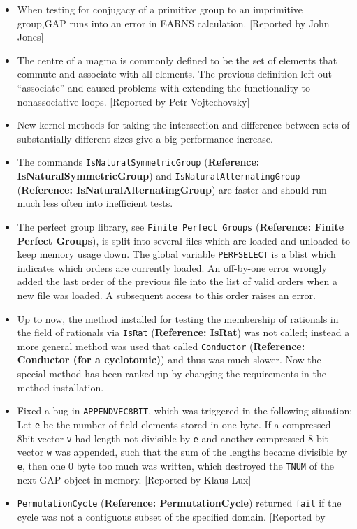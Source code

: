 \documentclass[a4paper,11pt]{report}
\begin{document}
{{\begin{itemize}
\item  When testing for conjugacy of a primitive group to an imprimitive group,\textsf{GAP} runs into an error in EARNS calculation. [Reported by John Jones] 
\item  The centre of a magma is commonly defined to be the set of elements that
commute and associate with all elements. The previous definition left out ``associate'' and caused problems with extending the functionality to nonassociative loops.
[Reported by Petr Vojtechovsky] 
\item  New kernel methods for taking the intersection and difference between sets of
substantially different sizes give a big performance increase. 
\item  The commands \texttt{IsNaturalSymmetricGroup} (\textbf{Reference: IsNaturalSymmetricGroup}) and \texttt{IsNaturalAlternatingGroup} (\textbf{Reference: IsNaturalAlternatingGroup}) are faster and should run much less often into inefficient tests. 
\item  The perfect group library, see \texttt{Finite Perfect Groups} (\textbf{Reference: Finite Perfect Groups}), is split into several files which are loaded and unloaded to keep memory
usage down. The global variable \texttt{PERFSELECT} is a blist which indicates which orders are currently loaded. An off-by-one
error wrongly added the last order of the previous file into the list of valid
orders when a new file was loaded. A subsequent access to this order raises an
error. 
\item  Up to now, the method installed for testing the membership of rationals in the
field of rationals via \texttt{IsRat} (\textbf{Reference: IsRat}) was not called; instead a more general method was used that called \texttt{Conductor} (\textbf{Reference: Conductor (for a cyclotomic)}) and thus was much slower. Now the special method has been ranked up by
changing the requirements in the method installation. 
\item  Fixed a bug in \texttt{APPEND{\textunderscore}VEC8BIT}, which was triggered in the following situation: Let \texttt{e} be the number of field elements stored in one byte. If a compressed
8bit-vector \texttt{v} had length not divisible by \texttt{e} and another compressed 8-bit vector \texttt{w} was appended, such that the sum of the lengths became divisible by \texttt{e}, then one 0 byte too much was written, which destroyed the \texttt{TNUM} of the next \textsf{GAP} object in memory. [Reported by Klaus Lux] 
\item  \texttt{PermutationCycle} (\textbf{Reference: PermutationCycle}) returned \texttt{fail} if the cycle was not a contiguous subset of the specified domain. [Reported by

\end{itemize}}}
\end{document}
